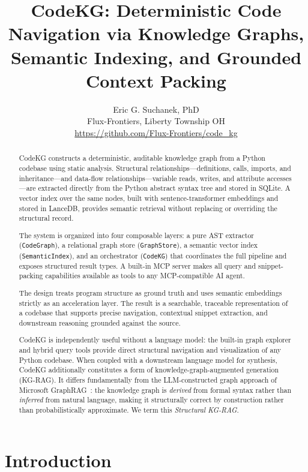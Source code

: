 \documentclass[10pt]{article}
\title{CodeKG: Deterministic Code Navigation via Knowledge Graphs,
Semantic Indexing, and Grounded Context Packing}
\author{Eric G. Suchanek, PhD\\
Flux-Frontiers, Liberty Township OH\\[4pt]
\small\url{https://github.com/Flux-Frontiers/code\_kg}}
\date{}
\begin{document}
\maketitle

\begin{abstract}
CodeKG constructs a deterministic, auditable knowledge graph from a Python codebase
using static analysis. Structural relationships---definitions, calls, imports,
and inheritance---and data-flow relationships---variable reads, writes, and attribute
accesses---are extracted directly from the Python abstract syntax tree and stored
in SQLite. A vector index over the same nodes, built with sentence-transformer
embeddings and stored in LanceDB, provides semantic retrieval without replacing or
overriding the structural record.

The system is organized into four composable layers: a pure AST extractor
(\texttt{CodeGraph}), a relational graph store (\texttt{GraphStore}), a semantic
vector index (\texttt{SemanticIndex}), and an orchestrator (\texttt{CodeKG}) that
coordinates the full pipeline and exposes structured result types. A built-in MCP
server makes all query and snippet-packing capabilities available as tools to any
MCP-compatible AI agent.

The design treats program structure as ground truth and uses semantic embeddings
strictly as an acceleration layer. The result is a searchable, traceable
representation of a codebase that supports precise navigation, contextual snippet
extraction, and downstream reasoning grounded against the source.

CodeKG is independently useful without a language model: the built-in graph
explorer and hybrid query tools provide direct structural navigation and
visualization of any Python codebase. When coupled with a downstream language
model for synthesis, CodeKG additionally constitutes a form of
knowledge-graph-augmented generation (KG-RAG). It differs fundamentally
from the LLM-constructed graph approach of Microsoft GraphRAG~\cite{edge2024graphrag}:
the knowledge graph is \emph{derived} from formal syntax rather than \emph{inferred}
from natural language, making it structurally correct by construction rather than
probabilistically approximate. We term this \emph{Structural KG-RAG}.
\end{abstract}

\section{Introduction}
\end{document}

